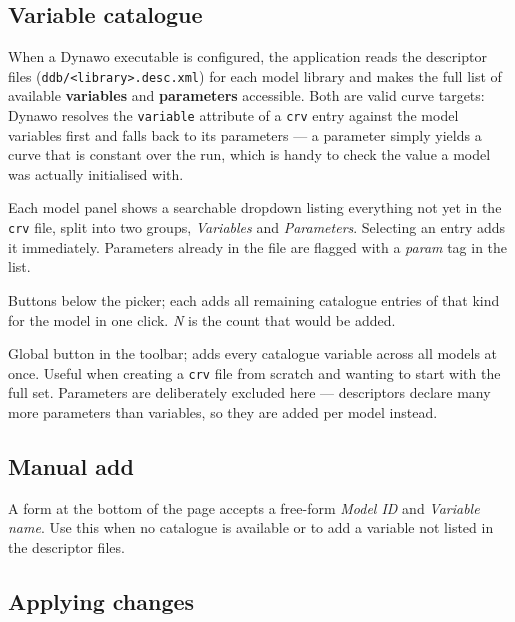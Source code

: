 \documentclass[a4paper,11pt]{article}
\newcommand{\code}[1]{\texttt{\small #1}}
\newcommand{\ftype}[1]{\texttt{\small\color{rteblu}#1}}
\begin{document}
\subsection{Variable catalogue}

When a Dynawo executable is configured, the application reads the descriptor
files (\code{ddb/<library>.desc.xml}) for each model library and makes the full
list of available \textbf{variables} and \textbf{parameters} accessible. Both
are valid curve targets: Dynawo resolves the \code{variable} attribute of a
\ftype{crv} entry against the model variables first and falls back to its
parameters --- a parameter simply yields a curve that is constant over the run,
which is handy to check the value a model was actually initialised with.

\begin{description}[leftmargin=2em]
  \item[\textbf{Dropdown picker}] Each model panel shows a searchable dropdown
    listing everything not yet in the \ftype{crv} file, split into two groups,
    \emph{Variables} and \emph{Parameters}. Selecting an entry adds it
    immediately. Parameters already in the file are flagged with a
    \emph{param} tag in the list.
  \item[\textbf{Add all variables (N)} / \textbf{Add all parameters (N)}]
    Buttons below the picker; each adds all remaining catalogue entries of that
    kind for the model in one click. \emph{N} is the count that would be added.
  \item[\textbf{Select all variables}] Global button in the toolbar; adds every
    catalogue variable across all models at once. Useful when creating a
    \ftype{crv} file from scratch and wanting to start with the full set.
    Parameters are deliberately excluded here --- descriptors declare many more
    parameters than variables, so they are added per model instead.
\end{description}

\subsection{Manual add}

A form at the bottom of the page accepts a free-form \emph{Model ID} and
\emph{Variable name}. Use this when no catalogue is available or to add a
variable not listed in the descriptor files.

\subsection{Applying changes}
\end{document}
